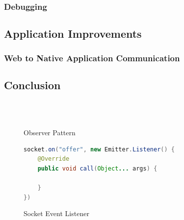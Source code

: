 \documentclass[]{report}
\begin{document}
			\subsection{Debugging}
		\section{Application Improvements}
			\subsection{Web to Native Application Communication}
		\section{Conclusion}
	
	\appendix
	\chapter{}
		\chapter{}
		\begin{figure}[h!]
			\caption{Observer Pattern}
			\begin{lstlisting}[language=Java,frame=single,breaklines=true]
			
			\end{lstlisting}
		\end{figure}
	\begin{figure}[h!]
		\caption{Socket Event Listener}
		\begin{lstlisting}[language=Java,frame=single,breaklines=true]
socket.on("offer", new Emitter.Listener() {
	@Override
	public void call(Object... args) {
		
	}
})
		\end{lstlisting}
	\end{figure}
	
\end{document}
